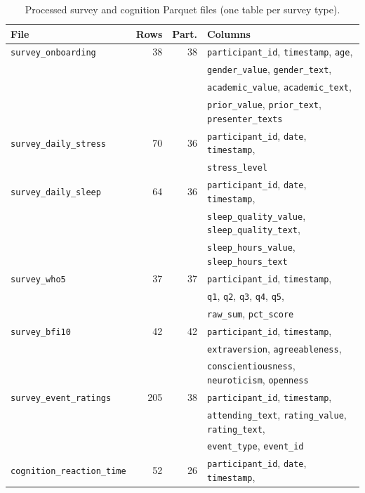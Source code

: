 \documentclass[11pt,a4paper]{article}
\begin{document}
\begin{table}[H]
\centering
\caption{Processed survey and cognition Parquet files (one table per survey type).}
\label{tab:processed_survey}
\small
\begin{tabular}{lrrl}
\toprule
\textbf{File} & \textbf{Rows} & \textbf{Part.} & \textbf{Columns} \\
\midrule
\texttt{survey\_onboarding}
    & 38 & 38
    & \texttt{participant\_id}, \texttt{timestamp}, \texttt{age}, \\
    & & & \texttt{gender\_value}, \texttt{gender\_text}, \\
    & & & \texttt{academic\_value}, \texttt{academic\_text}, \\
    & & & \texttt{prior\_value}, \texttt{prior\_text}, \texttt{presenter\_texts} \\
\texttt{survey\_daily\_stress}
    & 70 & 36
    & \texttt{participant\_id}, \texttt{date}, \texttt{timestamp}, \\
    & & & \texttt{stress\_level} \\
\texttt{survey\_daily\_sleep}
    & 64 & 36
    & \texttt{participant\_id}, \texttt{date}, \texttt{timestamp}, \\
    & & & \texttt{sleep\_quality\_value}, \texttt{sleep\_quality\_text}, \\
    & & & \texttt{sleep\_hours\_value}, \texttt{sleep\_hours\_text} \\
\texttt{survey\_who5}
    & 37 & 37
    & \texttt{participant\_id}, \texttt{timestamp}, \\
    & & & \texttt{q1}, \texttt{q2}, \texttt{q3}, \texttt{q4}, \texttt{q5}, \\
    & & & \texttt{raw\_sum}, \texttt{pct\_score} \\
\texttt{survey\_bfi10}
    & 42 & 42
    & \texttt{participant\_id}, \texttt{timestamp}, \\
    & & & \texttt{extraversion}, \texttt{agreeableness}, \\
    & & & \texttt{conscientiousness}, \texttt{neuroticism}, \texttt{openness} \\
\texttt{survey\_event\_ratings}
    & 205 & 38
    & \texttt{participant\_id}, \texttt{timestamp}, \\
    & & & \texttt{attending\_text}, \texttt{rating\_value}, \texttt{rating\_text}, \\
    & & & \texttt{event\_type}, \texttt{event\_id} \\
\texttt{cognition\_reaction\_time}
    & 52 & 26
    & \texttt{participant\_id}, \texttt{date}, \texttt{timestamp}, \\

\end{tabular}
\end{table}
\end{document}
